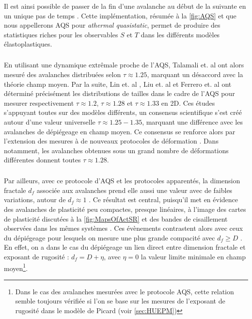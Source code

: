\noindent Il est ainsi possible de passer de la fin d'une avalanche au début de la suivante en un unique pas de temps \cite{lin_scaling_2014}. Cette implémentation, résumée à la \autoref{fig:AQS} et que nous appellerons AQS pour \textit{athermal quasistatic}, permet de produire des statistiques riches pour les observables $S$ et $T$ dans les différents modèles élastoplastiques.

\subparagraph{}En utilisant une dynamique extrêmale proche de l'AQS, Talamali et. al \cite{talamali_avalanches_2011} ont alors mesuré des avalanches distribuées selon $\tau \approx 1.25$, marquant un désaccord avec la théorie champ moyen. Par la suite, Lin et. al \cite{lin_scaling_2014}, Liu et. al \cite{liu_driving_2016} et Ferrero et. al \cite{ferrero_criticality_2019} ont déterminé précisément les distributions de tailles dans le cadre de l'AQS pour mesurer respectivement $\tau \approx 1.2$, $\tau \approx 1.28$ et $\tau\approx 1.33$ en 2D. Ces études s'appuyant toutes sur des modèles différents, un consensus scientifique s'est créé autour d'une valeur universelle $\tau \approx 1.25-1.35$, marquant une différence avec les avalanches de dépiégeage en champ moyen. Ce consensus se renforce alors par l'extension des mesures à de nouveaux protocoles de déformation \cite{lin_scaling_2014, budrikis_universal_2017}. Dans \cite{budrikis_universal_2017} notamment, les avalanches obtenues sous un grand nombre de déformations différentes donnent toutes $\tau\approx1.28$. 

\subparagraph{}Par ailleurs, avec ce protocole d'AQS et les protocoles apparentés, la dimension fractale $d_f$ associée aux avalanches prend elle aussi une valeur avec de faibles variations, autour de $d_f \approx 1$ \cite{liu_driving_2016, lin_scaling_2014, ferrero_criticality_2019}. Ce résultat est central, puisqu'il met en évidence des avalanches de plasticité peu compactes, presque linéaires, à l'image des cartes de plasticité discutées à la \autoref{fig:MapsOfActSR} et des bandes de cisaillement observées dans les mêmes systèmes \cite{martens_spontaneous_2012}. Ces évènements contrastent alors avec ceux du dépiégeage pour lesquels on mesure une plus grande compacité avec $d_f \geq D$ \cite{wiese_theory_2022, le_priol_spatial_2021}. En effet, on a dans le cas du dépiégeage un lien direct entre dimension fractale et exposant de rugosité : $d_f = D + \eta$, avec $\eta = 0$ la valeur limite minimale en champ moyen\footnote{Dans le cas des avalanches mesurées avec le protocole AQS, cette relation semble toujours vérifiée si l'on se base sur les mesures de l'exposant de rugosité dans le modèle de Picard (voir \autoref{sec:HUEPM})}.

